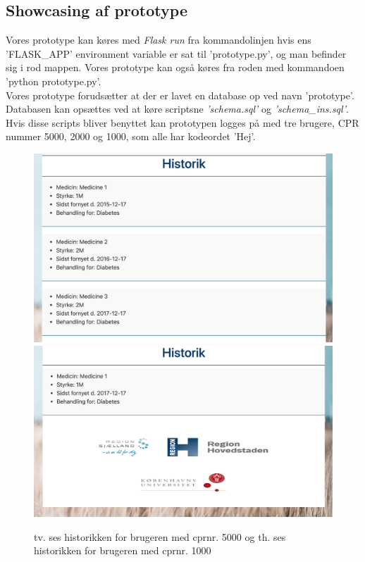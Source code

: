 \newpage
\subsection{Showcasing af prototype}
Vores prototype kan køres med \textit{Flask run} fra kommandolinjen hvis ens 'FLASK\_APP' environment variable er sat til 'prototype.py', og man befinder sig i rod mappen. Vores prototype kan også køres fra roden med kommandoen 'python prototype.py'.\\
Vores prototype forudsætter at der er lavet en database op ved navn 'prototype'. Databasen kan opsættes ved at køre scriptsne \textit{'schema.sql'} og \textit{'schema\_ins.sql'}. Hvis disse scripts bliver benyttet kan prototypen logges på med tre brugere, CPR nummer 5000, 2000 og 1000, som alle har kodeordet 'Hej'.

\begin{figure}[h!]
	\includegraphics[width=0.49\linewidth]{Materials/Prototype/Historik}
	\includegraphics[width=0.49\linewidth]{Materials/Prototype/Historik2}
	\caption{tv. ses historikken for brugeren med cprnr. 5000 og th. ses historikken for brugeren med cprnr. 1000}
\end{figure}

